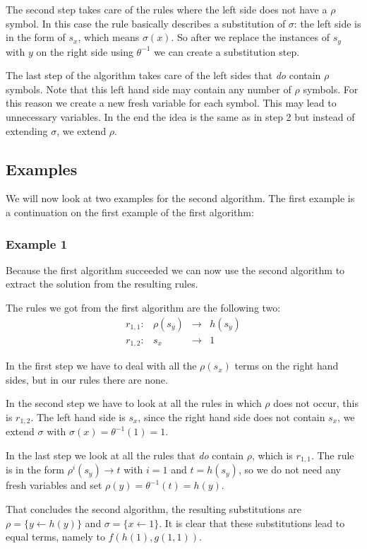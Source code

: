 The second step takes care of the rules where the left side does not have a $\rho$ symbol. In this case the rule basically describes a substitution of $\sigma$: the left side is in the form of $s_x$, which means $\sigma(x)$. So after we replace the instances of $s_y$ with $y$ on the right side using $\theta^{-1}$ we can create a substitution step.

The last step of the algorithm takes care of the left sides that \textit{do} contain $\rho$ symbols. Note that this left hand side may contain any number of $\rho$ symbols. For this reason we create a new fresh variable for each symbol. This may lead to unnecessary variables. In the end the idea is the same as in step 2 but instead of extending $\sigma$, we extend $\rho$. 

\subsection{Examples} %
We will now look at two examples for the second algorithm. The first example is a continuation on the first example of the first algorithm:
\subsubsection*{Example 1}
Because the first algorithm succeeded we can now use the second algorithm to extract the solution from the resulting rules. 

The rules we got from the first algorithm are the following two:
$$
\begin{array}{lrcl}
    r_{1,1}: & \rho(s_y) & \rightarrow & h(s_y) \\
    r_{1,2}: & s_x & \rightarrow & 1
\end{array}
$$

In the first step we have to deal with all the $\rho(s_x)$ terms on the right hand sides, but in our rules there are none. 

In the second step we have to look at all the rules in which $\rho$ does not occur, this is $r_{1,2}$. The left hand side is $s_x$, since the right hand side does not contain $s_x$, we extend $\sigma$ with $\sigma(x) = \theta^{-1}(1) = 1$.

In the last step we look at all the rules that \textit{do} contain $\rho$, which is $r_{1,1}$. The rule is in the form $\rho^i(s_y) \rightarrow t$ with $i=1$ and $t = h(s_y)$, so we do not need any fresh variables and set $\rho(y) = \theta^{-1}(t) = h(y)$.

That concludes the second algorithm, the resulting substitutions are $\rho = \{ y \leftarrow h(y) \}$ and $\sigma = \{ x \leftarrow 1 \}$. It is clear that these substitutions lead to equal terms, namely to $f(h(1), g(1, 1))$. 

